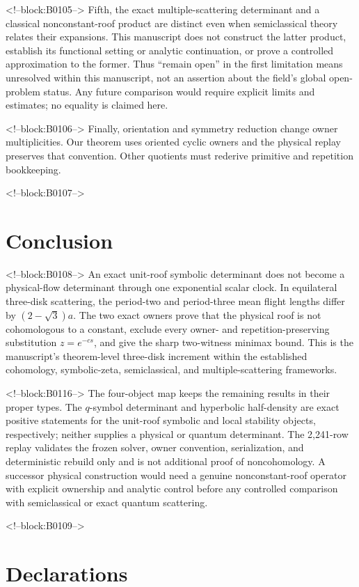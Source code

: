 \documentclass[11pt,a4paper]{article}
\theoremstyle{definition}
\theoremstyle{remark}
\begin{document}
<!--block:B0105-->
Fifth, the exact multiple-scattering determinant and a classical nonconstant-roof product are distinct even when semiclassical theory relates their expansions. This manuscript does not construct the latter product, establish its functional setting or analytic continuation, or prove a controlled approximation to the former. Thus ``remain open'' in the first limitation means unresolved within this manuscript, not an assertion about the field's global open-problem status. Any future comparison would require explicit limits and estimates; no equality is claimed here.

<!--block:B0106-->
Finally, orientation and symmetry reduction change owner multiplicities. Our theorem uses oriented cyclic owners and the physical replay preserves that convention. Other quotients must rederive primitive and repetition bookkeeping.

<!--block:B0107-->
\section{Conclusion}

<!--block:B0108-->
An exact unit-roof symbolic determinant does not become a physical-flow determinant through one exponential scalar clock. In equilateral three-disk scattering, the period-two and period-three mean flight lengths differ by \((2-\sqrt3)a\). The two exact owners prove that the physical roof is not cohomologous to a constant, exclude every owner- and repetition-preserving substitution \(z=e^{-cs}\), and give the sharp two-witness minimax bound. This is the manuscript's theorem-level three-disk increment within the established cohomology, symbolic-zeta, semiclassical, and multiple-scattering frameworks.

<!--block:B0116-->
The four-object map keeps the remaining results in their proper types. The \(q\)-symbol determinant and hyperbolic half-density are exact positive statements for the unit-roof symbolic and local stability objects, respectively; neither supplies a physical or quantum determinant. The 2,241-row replay validates the frozen solver, owner convention, serialization, and deterministic rebuild only and is not additional proof of noncohomology. A successor physical construction would need a genuine nonconstant-roof operator with explicit ownership and analytic control before any controlled comparison with semiclassical or exact quantum scattering.

<!--block:B0109-->
\section*{Declarations}
\end{document}
